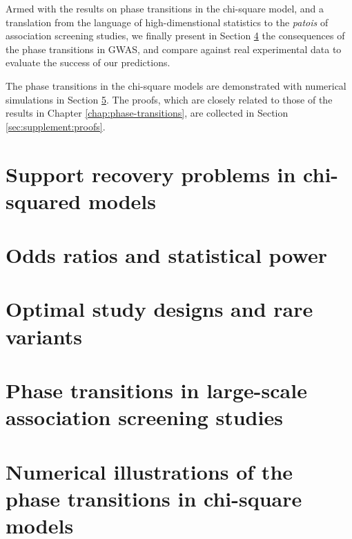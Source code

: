 Armed with the results on phase transitions in the chi-square model, and a translation from the language of high-dimenstional statistics to the {\em patois} of association screening studies, we finally present in Section \ref{sec:phase-transitions-in-GWAS} the consequences of the phase transitions in \ac{GWAS}, and compare against real experimental data to evaluate the success of our predictions.

The phase transitions in the chi-square models are demonstrated with numerical simulations in Section \ref{sec:numerical}.
The proofs, which are closely related to those of the results in Chapter \ref{chap:phase-transitions},
 are collected in Section \ref{sec:supplement:proofs}.


\section{Support recovery problems in chi-squared models}
\label{sec:chisq-boundaries}



\section{Odds ratios and statistical power}
\label{sec:odds-and-power}



\section{Optimal study designs and rare variants}
\label{sec:optimal-design} 



\section{Phase transitions in large-scale association screening studies}
\label{sec:phase-transitions-in-GWAS}



\section{Numerical illustrations of the phase transitions in chi-square models}
\label{sec:numerical}



%
